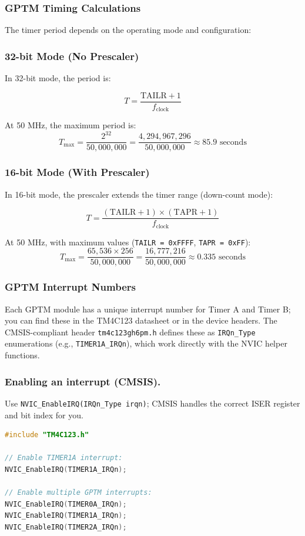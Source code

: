 \subsubsection{GPTM Timing Calculations}

The timer period depends on the operating mode and configuration:
\bigskip
\subsubsection*{32-bit Mode (No Prescaler)}

In 32-bit mode, the period is:

\[
T = \frac{\text{TAILR} + 1}{f_{\text{clock}}}
\]

\noindent
At 50 MHz, the maximum period is:
\[
T_{\text{max}} = \frac{2^{32}}{50{,}000{,}000} = \frac{4{,}294{,}967{,}296}{50{,}000{,}000} \approx 85.9 \text{ seconds}
\]
\bigskip
\subsubsection*{16-bit Mode (With Prescaler)}

In 16-bit mode, the prescaler extends the timer range (down-count mode):

\[
T = \frac{(\text{TAILR} + 1) \times (\text{TAPR} + 1)}{f_{\text{clock}}}
\]

\noindent
At 50 MHz, with maximum values (\texttt{TAILR = 0xFFFF}, \texttt{TAPR = 0xFF}):
\[
T_{\text{max}} = \frac{65{,}536 \times 256}{50{,}000{,}000} = \frac{16{,}777{,}216}{50{,}000{,}000} \approx 0.335 \text{ seconds}
\]

\noindent


\subsubsection{GPTM Interrupt Numbers}
Each GPTM module has a unique interrupt number for Timer A and Timer B; you can find these in the TM4C123 datasheet or in the device headers. The CMSIS-compliant header \texttt{tm4c123gh6pm.h} defines these as \texttt{IRQn\_Type} enumerations (e.g., \texttt{TIMER1A\_IRQn}), which work directly with the NVIC helper functions.

\subsubsection*{Enabling an interrupt (CMSIS).}
Use \texttt{NVIC\_EnableIRQ(IRQn\_Type irqn)}; CMSIS handles the correct ISER register and bit index for you.
\begin{lstlisting}[language=C]
#include "TM4C123.h"

// Enable TIMER1A interrupt:
NVIC_EnableIRQ(TIMER1A_IRQn);

// Enable multiple GPTM interrupts:
NVIC_EnableIRQ(TIMER0A_IRQn);
NVIC_EnableIRQ(TIMER1A_IRQn);
NVIC_EnableIRQ(TIMER2A_IRQn);
\end{lstlisting}

